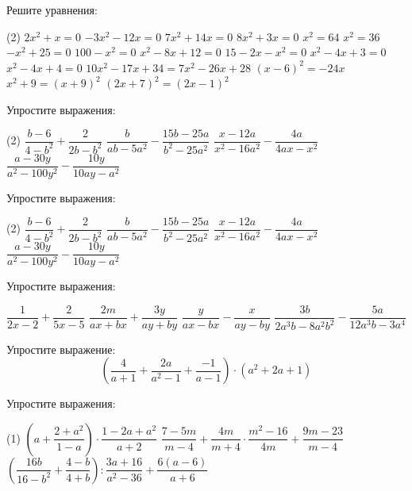 \begin{class}[number=2]
	\begin{listofex}
		\item Решите уравнения:
		\begin{tasks}(2)
			\task \( 2x^2+x=0 \)
			\task \( -3x^2-12x=0 \)
			\task \( 7x^2+14x=0 \)
			\task \( 8x^2+3x=0 \)
			\task \( x^2=64 \)
			\task \( x^2=36 \)
			\task \( -x^2+25=0 \)
			\task \( 100-x^2=0 \)
			\task \( x^2-8x+12=0 \)
			\task \( 15-2x-x^2=0 \)
			\task \( x^2-4x+3=0 \)
			\task \( x^2-4x+4=0 \)
			\task \( 10x^2-17x+34=7x^2-26x+28 \)
			\task \( (x-6)^2=-24x \)
			\task \( x^2+9=(x+9)^2 \)
			\task \( (2x+7)^2=(2x-1)^2 \)
		\end{tasks}
		\item Упростите выражения:
		\begin{tasks}(2)
			\task \( \dfrac{b-6}{4-b^2}+\dfrac{2}{2b-b^2} \)
			\task \( \dfrac{b}{ab-5a^2}-\dfrac{15b-25a}{b^2-25a^2} \)
			\task \( \dfrac{x-12a}{x^2-16a^2}-\dfrac{4a}{4ax-x^2} \)
			\task \( \dfrac{a-30y}{a^2-100y^2}-\dfrac{10y}{10ay-a^2} \)
		\end{tasks}
	\end{listofex}
\end{class}

\begin{class}[number=3]
	\begin{listofex}
		\item Упростите выражения:
		\begin{tasks}(2)
			\task \( \dfrac{b-6}{4-b^2}+\dfrac{2}{2b-b^2} \)
			\task \( \dfrac{b}{ab-5a^2}-\dfrac{15b-25a}{b^2-25a^2} \)
			\task \( \dfrac{x-12a}{x^2-16a^2}-\dfrac{4a}{4ax-x^2} \)
			\task \( \dfrac{a-30y}{a^2-100y^2}-\dfrac{10y}{10ay-a^2} \)
		\end{tasks}
		\item Упростите выражения:
		\begin{itasks}[2]
			\task \( \dfrac{1}{2x-2}+\dfrac{2}{5x-5} \)
			\task \( \dfrac{2m}{ax+bx}+\dfrac{3y}{ay+by} \)
			\task \( \dfrac{y}{ax-bx}-\dfrac{x}{ay-by} \)
			\task \( \dfrac{3b}{2a^3b-8a^2b^2}-\dfrac{5a}{12a^3b-3a^4} \)
		\end{itasks}
		\item Упростите выражение: \[ \left( \dfrac{4}{a+1}+\dfrac{2a}{a^2-1}+\dfrac{-1}{a-1} \right)\cdot(a^2+2a+1) \]
		\item Упростите выражения:
		\begin{tasks}(1)
			\task \( \left( a+\dfrac{2+a^2}{1-a} \right)\cdot\dfrac{1-2a+a^2}{a+2} \)
			\task \( \dfrac{7-5m}{m-4}+\dfrac{4m}{m+4}\cdot\dfrac{m^2-16}{4m}+\dfrac{9m-23}{m-4} \)
			\task \( \left( \dfrac{16b}{16-b^2}+\dfrac{4-b}{4+b} \right):\dfrac{3a+16}{a^2-36}+\dfrac{6(a-6)}{a+6} \)
		\end{tasks}
	\end{listofex}
\end{class}

